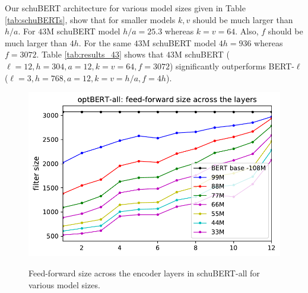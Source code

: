 \documentclass[11pt,a4paper]{article}
\begin{document}
Our schuBERT architecture for various model sizes given in Table \ref{tab:schuBERTs}, show that for smaller models $k,v$ should be much larger than $h/a$. For $43$M schuBERT model $h/a = 25.3$ whereas $k=v=64$. Also, $f$ should be much larger than $4h$. For the same $43$M schuBERT model $4h=936$ whereas $f=3072$. Table \ref{tab:results_43} shows that $43$M schuBERT  ($\ell=12, h = 304, a= 12, k=v=64, f=3072$) significantly outperforms BERT-$\ell$ ($\ell=3, h = 768, a = 12, k=v=h/a, f=4h$).
\begin{figure}
 \begin{center}
	\includegraphics[width=0.7\linewidth]{hidden.pdf}
	\caption{Feed-forward size across the encoder layers in schuBERT-all for various model sizes.    
	}
	\vspace{-1em}
	\label{fig:hidden}
\end{center}
\end{figure}




\end{document}
